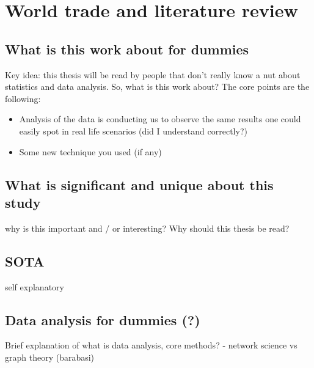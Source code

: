 \chapter{World trade and literature review}

\section{What is this work about for dummies}
Key idea: this thesis will be read by people that don't really know a nut about statistics and data analysis. 
So, what is this work about? 
The core points are the following:
\begin{itemize}
    \item Analysis of the data is conducting us to observe the same results one could easily spot in real life scenarios (did I understand correctly?)
    \item Some new technique you used (if any)
\end{itemize}
\section{What is significant and unique about this study}
why is this important and / or interesting? Why should this thesis be read?
\section{SOTA}
self explanatory
\section{Data analysis for dummies (?)}
Brief explanation of what is data analysis, core methods?
- network science vs graph theory (barabasi)
